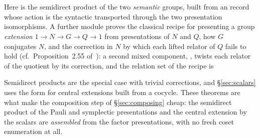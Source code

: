 \endgroup
\begin{code}[hide]%
%
\>[4]\AgdaSpace{}%
\AgdaSymbol{=}\AgdaSpace{}%
\<%
\\
%
\\[\AgdaEmptyExtraSkip]%
\>[0]\AgdaSpace{}%
\AgdaSymbol{:}\AgdaSpace{}%
\AgdaSpace{}%
\AgdaSpace{}%
\AgdaSpace{}%
\AgdaSpace{}%
\AgdaSpace{}%
\AgdaSpace{}%
\AgdaSpace{}%
\AgdaSpace{}%
\<%
\end{code}

\noindent Here  is the semidirect product of the two
\emph{semantic} groups, built from an  record whose action
is the syntactic  transported through the two presentation
isomorphisms.  A further module proves the classical recipe for
presenting a group \emph{extension} $1 \to N \to G \to Q \to 1$ from
presentations of $N$ and $Q$, how $G$ conjugates $N$, and the
correction in $N$ by which each lifted relator of $Q$ fails to hold
(cf.\ Proposition~2.55 of~\cite{holt2005handbook}): a second mixed
component, , twists each relator of the quotient by its
correction, and the relation set of the recipe is
\begingroup\renewcommand{\AgdaCodeStyle}{\footnotesize}
\begin{code}%
\>[0]\AgdaSpace{}%
\AgdaSpace{}%
\AgdaSpace{}%
\AgdaSpace{}%
\AgdaSpace{}%
\AgdaSymbol{=}\AgdaSpace{}%
\AgdaSpace{}%
\AgdaSpace{}%
\AgdaSpace{}%
\AgdaSpace{}%
\AgdaSymbol{(}\AgdaSpace{}%
\AgdaSpace{}%
\AgdaSpace{}%
\AgdaSpace{}%
\AgdaSpace{}%
\AgdaSymbol{)}\<%
\end{code}
\endgroup
Semidirect products are the special case with trivial corrections, and
\S\ref{sec:scalars} uses the form for central extensions built from a
cocycle.  These theorems are what make the composition step of
\S\ref{sec:composing} cheap: the semidirect product of the Pauli and
symplectic presentations and the central extension by the scalars are
\emph{assembled} from the factor presentations, with no fresh coset
enumeration at all.
